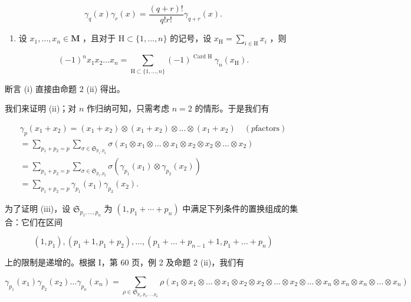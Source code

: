 \[
\gamma_ {q} (x) \gamma_ {r} (x) = \frac {(q + r) !}{q ! r !} \gamma_ {q + r} (x).
\]

\begin{enumerate}
\def\labelenumi{(\alph{enumi})}
\setcounter{enumi}{21}
\tightlist
\item
  设 \(x_{1}, \ldots, x_{n} \in \mathbf{M}\) ，且对于 \(\mathrm{H} \subset \{1, \ldots, n\}\) 的记号，设 \(x_{\mathrm{H}} = \sum_{i \in \mathrm{H}} x_{i}\) ，则
\end{enumerate}

\[
(- 1) ^ {n} x _ {1} x _ {2} \dots x _ {n} = \sum_ {\mathrm{H} \subset \{1, \dots , n \}} (- 1) ^ {\text { Card   H }} \gamma_ {n} (x _ {\mathrm{H}}).
\]

断言 (i) 直接由命题 2 (ii) 得出。

我们来证明 (ii)；对 \(n\) 作归纳可知，只需考虑 \(n = 2\) 的情形。于是我们有

\[
\begin{array}{l} \gamma_ {p} (x _ {1} + x _ {2}) = (x _ {1} + x _ {2}) \otimes (x _ {1} + x _ {2}) \otimes \dots \otimes (x _ {1} + x _ {2}) \quad (p \text {factors}) \\ = \sum_ {p _ {1} + p _ {2} = p} \sum_ {\sigma \in \mathfrak {S} _ {p _ {1}, p _ {2}}} \sigma (x _ {1} \otimes x _ {1} \otimes \dots \otimes x _ {1} \otimes x _ {2} \otimes x _ {2} \otimes \dots \otimes x _ {2}) \\ = \sum_ {p _ {1} + p _ {2} = p} \sum_ {\sigma \in \mathfrak {S} _ {p _ {1}, p _ {2}}} \sigma (\gamma_ {p _ {1}} (x _ {1}) \otimes \gamma_ {p _ {2}} (x _ {2})) \\ = \sum_ {p _ {1} + p _ {2} = p} \gamma_ {p _ {1}} (x _ {1}) \gamma_ {p _ {2}} (x _ {2}). \end{array}
\]

为了证明 (iii)，设 \(\mathfrak{S}_{p_{1},\ldots,p_{n}}\) 为 \((1,p_{1}+\cdots+p_{n})\) 中满足下列条件的置换组成的集合：它们在区间

\[
\left(1, p _ {1}\right), \left(p _ {1} + 1, p _ {1} + p _ {2}\right), \dots , \left(p _ {1} + \dots + p _ {n - 1} + 1, p _ {1} + \dots + p _ {n}\right)
\]

上的限制是递增的。根据 I，第 60 页，例 2 及命题 2 (ii)，我们有

\[
\gamma_ {p _ {1}} \left(x _ {1}\right) \gamma_ {p _ {2}} \left(x _ {2}\right) \dots \gamma_ {p _ {n}} \left(x _ {n}\right) = \sum_ {\rho \in \mathfrak {S} _ {p _ {1}, p _ {2}, \dots , p _ {n}}} \rho \left(x _ {1} \otimes x _ {1} \otimes \dots \otimes x _ {1} \otimes x _ {2} \otimes x _ {2} \otimes \dots \otimes x _ {2} \otimes \dots \otimes x _ {n} \otimes x _ {n} \otimes x _ {n} \otimes \dots \otimes x _ {n}\right)
\]

